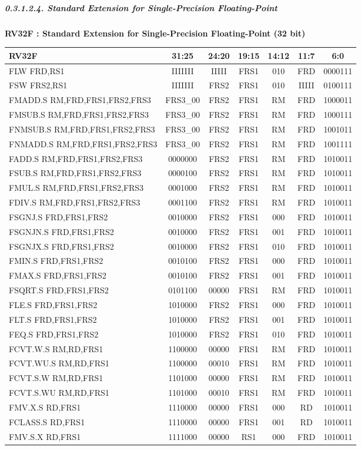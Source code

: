 \documentclass[
]{article}
\begin{document}
\hypertarget{standard-extension-for-single-precision-floating-point-1}{%
\subparagraph{0.3.1.2.4. Standard Extension for Single-Precision
Floating-Point}\label{standard-extension-for-single-precision-floating-point-1}}

\textbf{RV32F : Standard Extension for Single-Precision Floating-Point
(32 bit)}

\begin{longtable}[]{@{}lcccccc@{}}
\toprule
RV32F & 31:25 & 24:20 & 19:15 & 14:12 & 11:7 & 6:0\tabularnewline
\midrule
\endhead
FLW FRD,RS1 & IIIIIII & IIIII & FRS1 & 010 & FRD &
0000111\tabularnewline
FSW FRS2,RS1 & IIIIIII & FRS2 & FRS1 & 010 & IIIII &
0100111\tabularnewline
FMADD.S RM,FRD,FRS1,FRS2,FRS3 & FRS3\_00 & FRS2 & FRS1 & RM & FRD &
1000011\tabularnewline
FMSUB.S RM,FRD,FRS1,FRS2,FRS3 & FRS3\_00 & FRS2 & FRS1 & RM & FRD &
1000111\tabularnewline
FNMSUB.S RM,FRD,FRS1,FRS2,FRS3 & FRS3\_00 & FRS2 & FRS1 & RM & FRD &
1001011\tabularnewline
FNMADD.S RM,FRD,FRS1,FRS2,FRS3 & FRS3\_00 & FRS2 & FRS1 & RM & FRD &
1001111\tabularnewline
FADD.S RM,FRD,FRS1,FRS2,FRS3 & 0000000 & FRS2 & FRS1 & RM & FRD &
1010011\tabularnewline
FSUB.S RM,FRD,FRS1,FRS2,FRS3 & 0000100 & FRS2 & FRS1 & RM & FRD &
1010011\tabularnewline
FMUL.S RM,FRD,FRS1,FRS2,FRS3 & 0001000 & FRS2 & FRS1 & RM & FRD &
1010011\tabularnewline
FDIV.S RM,FRD,FRS1,FRS2,FRS3 & 0001100 & FRS2 & FRS1 & RM & FRD &
1010011\tabularnewline
FSGNJ.S FRD,FRS1,FRS2 & 0010000 & FRS2 & FRS1 & 000 & FRD &
1010011\tabularnewline
FSGNJN.S FRD,FRS1,FRS2 & 0010000 & FRS2 & FRS1 & 001 & FRD &
1010011\tabularnewline
FSGNJX.S FRD,FRS1,FRS2 & 0010000 & FRS2 & FRS1 & 010 & FRD &
1010011\tabularnewline
FMIN.S FRD,FRS1,FRS2 & 0010100 & FRS2 & FRS1 & 000 & FRD &
1010011\tabularnewline
FMAX.S FRD,FRS1,FRS2 & 0010100 & FRS2 & FRS1 & 001 & FRD &
1010011\tabularnewline
FSQRT.S FRD,FRS1,FRS2 & 0101100 & 00000 & FRS1 & RM & FRD &
1010011\tabularnewline
FLE.S FRD,FRS1,FRS2 & 1010000 & FRS2 & FRS1 & 000 & FRD &
1010011\tabularnewline
FLT.S FRD,FRS1,FRS2 & 1010000 & FRS2 & FRS1 & 001 & FRD &
1010011\tabularnewline
FEQ.S FRD,FRS1,FRS2 & 1010000 & FRS2 & FRS1 & 010 & FRD &
1010011\tabularnewline
FCVT.W.S RM,RD,FRS1 & 1100000 & 00000 & FRS1 & RM & FRD &
1010011\tabularnewline
FCVT.WU.S RM,RD,FRS1 & 1100000 & 00010 & FRS1 & RM & FRD &
1010011\tabularnewline
FCVT.S.W RM,RD,FRS1 & 1101000 & 00000 & FRS1 & RM & FRD &
1010011\tabularnewline
FCVT.S.WU RM,RD,FRS1 & 1101000 & 00010 & FRS1 & RM & FRD &
1010011\tabularnewline
FMV.X.S RD,FRS1 & 1110000 & 00000 & FRS1 & 000 & RD &
1010011\tabularnewline
FCLASS.S RD,FRS1 & 1110000 & 00000 & FRS1 & 001 & RD &
1010011\tabularnewline
FMV.S.X RD,FRS1 & 1111000 & 00000 & RS1 & 000 & FRD &
1010011\tabularnewline
\bottomrule
\end{longtable}
\end{document}
